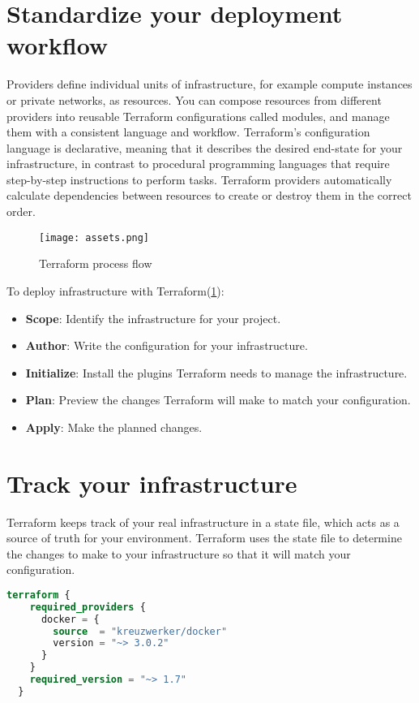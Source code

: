 \documentclass[../main.tex]{subfiles}
\begin{document}
\section{Standardize your deployment workflow}
Providers define individual units of infrastructure, for example compute instances or private networks, as resources.
You can compose resources from different providers into reusable Terraform configurations called modules, and manage them with a consistent language and workflow.
Terraform's configuration language is declarative, meaning that it describes the desired end-state for your infrastructure, in contrast to procedural programming languages that require step-by-step instructions to perform tasks.
Terraform providers automatically calculate dependencies between resources to create or destroy them in the correct order.
\begin{figure}[!ht]
  \centerline{\texttt{[image: assets.png]}}
  \caption{Terraform process flow}
  \label{img:terraform-process-flow}
\end{figure}

To deploy infrastructure with Terraform(\ref{img:terraform-process-flow}):

\begin{itemize}
  \item {\textbf{Scope}: Identify the infrastructure for your project.}
  \item {\textbf{Author}: Write the configuration for your infrastructure.}
  \item {\textbf{Initialize}: Install the plugins Terraform needs to manage the infrastructure.}
  \item {\textbf{Plan}: Preview the changes Terraform will make to match your configuration.}
  \item {\textbf{Apply}: Make the planned changes.}
\end{itemize}
\section{Track your infrastructure}
Terraform keeps track of your real infrastructure in a state file, which acts as a source of truth for your environment.
Terraform uses the state file to determine the changes to make to your infrastructure so that it will match your configuration.

\begin{lstlisting}[caption=terraform.tf,language=Terraform]
  terraform {
    required_providers {
      docker = {
        source  = "kreuzwerker/docker"
        version = "~> 3.0.2"
      }
    }
    required_version = "~> 1.7"
  }
\end{lstlisting}
\end{document}
